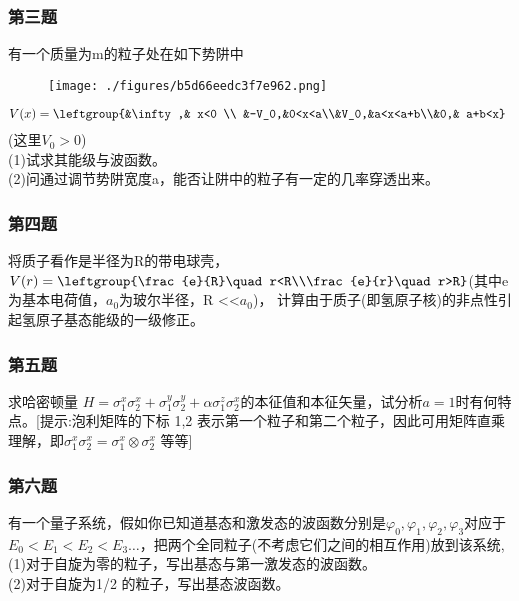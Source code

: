 \subsubsection{第三题}
有一个质量为m的粒子处在如下势阱中
\begin{figure}[ht]
\centering
\texttt{[image: ./figures/b5d66eedc3f7e962.png]}
\caption{} \label{fig_ZDLZ12_1}
\end{figure}
\begin{equation}
V(x)=\leftgroup{&\infty,& x<0 \\ &-V_0,&0<x<a\\&V_0,&a<x<a+b\\&0,& a+b<x}~
\end{equation}
(这里$V_0>0$)\\
(1)试求其能级与波函数。\\
(2)问通过调节势阱宽度a，能否让阱中的粒子有一定的几率穿透出来。
\subsubsection{第四题}
将质子看作是半径为R的带电球壳，$V(r)=\leftgroup{\frac{e}{R}\quad r<R\\\frac{e}{r}\quad r>R}$(其中e为基本电荷值，$a_0$为玻尔半径，R <<$a_0$)， 计算由于质子(即氢原子核)的非点性引起氢原子基态能级的一级修正。
\subsubsection{第五题}
求哈密顿量 $H=\sigma_1^x\sigma_2^x+\sigma_1^y\sigma_2^y+\alpha \sigma_1^z\sigma^x_2$的本征值和本征矢量，试分析$a =1$时有何特点。[提示:泡利矩阵的下标 1,2 表示第一个粒子和第二个粒子，因此可用矩阵直乘理解，即$\sigma_1^x\sigma_2^x=\sigma_1^x \otimes \sigma_2^x$ 等等]
\subsubsection{第六题}
有一个量子系统，假如你已知道基态和激发态的波函数分别是$\varphi_0,\varphi_1,\varphi_2,\varphi_3$对应于$E_0<E_1<E_2<E_3 \dots$，把两个全同粒子(不考虑它们之间的相互作用)放到该系统,\\
(1)对于自旋为零的粒子，写出基态与第一激发态的波函数。\\
(2)对于自旋为1/2 的粒子，写出基态波函数。

